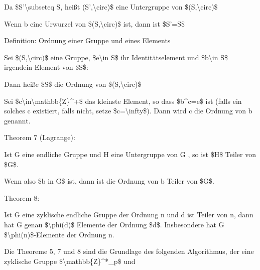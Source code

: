\documentclass[a4paper]{article}
\begin{document}
\begin{multicols}{3}
\begin{itemize*}
\begin{itemize*}
                  \item Da \$S'\textbackslash subseteq S, heißt (S',\textbackslash circ)\$ eine Untergruppe von \$(S,\textbackslash circ)\$
                  \item Wenn b eine Urwurzel von \$(S,\textbackslash circ)\$ ist, dann ist \$S'=S\$
            \end{itemize*}
            \item Definition: Ordnung einer Gruppe und eines Elements
            \begin{itemize*}
                  \item Sei \$(S,\textbackslash circ)\$ eine Gruppe, \$e\textbackslash in S\$ ihr Identitätselement und \$b\textbackslash in S\$ irgendein Element von \$S\$:
                  \begin{itemize*} \item Dann heiße \$\textbar S\textbar\$ die Ordnung von \$(S,\textbackslash circ)\$ \item Sei \$c\textbackslash in\textbackslash mathbb\{Z\}\^{}+\$ das kleinste Element, so dass \$b\^{}c=e\$ ist (falls ein solches c existiert, falls nicht, setze \$c=\textbackslash infty\$). Dann wird c die Ordnung von b genannt. \end{itemize*}
            \end{itemize*}
            \item Theorem 7 (Lagrange):
            \begin{itemize*}
                  \item Ist G eine endliche Gruppe und H eine Untergruppe von G , so ist \$\textbar H\textbar\$ Teiler von \$\textbar G\textbar\$.
                  \item Wenn also \$b in G\$ ist, dann ist die Ordnung von b Teiler von \$\textbar G\textbar\$.
            \end{itemize*}
            \item Theorem 8:
            \begin{itemize*}
                  \item Ist G eine zyklische endliche Gruppe der Ordnung n und d ist Teiler von n, dann hat G genau \$\textbackslash phi(d)\$ Elemente der Ordnung \$d\$. Insbesondere hat G \$\textbackslash phi(n)\$-Elemente der Ordnung n.
            \end{itemize*}
            \item Die Theoreme 5, 7 und 8 sind die Grundlage des folgenden Algorithmus,
            der eine zyklische Gruppe \$\textbackslash mathbb\{Z\}\^{}*\_p\$ und

\end{itemize*}
\end{multicols}
\end{document}
